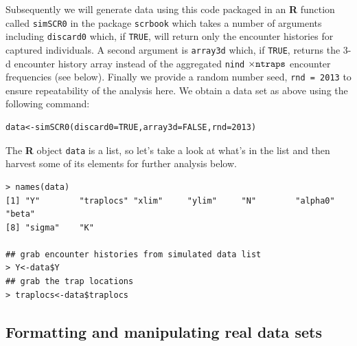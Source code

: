  Subsequently we will generate data using this code packaged in an
 {\bf R} function called \mbox{\tt simSCR0} in the package
 \mbox{\tt scrbook} which takes a number of arguments including
 \mbox{\tt discard0} which, if \mbox{\tt TRUE}, will return only the
 encounter histories for captured individuals.  A second argument is
 \mbox{\tt array3d} which, if \mbox{\tt TRUE}, returns the 3-d
 encounter history array instead of the aggregated \mbox{\tt nind}
 $\times \mbox{\tt ntraps}$ encounter frequencies (see below). Finally
 we provide a random number seed, \mbox{\tt rnd = 2013} to ensure
 repeatability of the analysis here. We obtain a data set as above
 using the following command:
\begin{verbatim}
data<-simSCR0(discard0=TRUE,array3d=FALSE,rnd=2013)
\end{verbatim}
The {\bf R} object \mbox{\tt data} is a list, so let's take a look at
what's in the list and then harvest some of its elements for further
analysis below.
{\small
\begin{verbatim}
> names(data)
[1] "Y"        "traplocs" "xlim"     "ylim"     "N"        "alpha0"   "beta"
[8] "sigma"    "K"

## grab encounter histories from simulated data list
> Y<-data$Y
## grab the trap locations
> traplocs<-data$traplocs
\end{verbatim}
}

\subsection{Formatting and manipulating real data sets}
\label{scr0.sec.formats}

